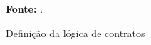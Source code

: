 \begin{figure}[ht!]
\centering

\caption{\textmd{Definição da lógica de contratos}}
\label{fig:ergologica}

\par\medskip\textbf{Fonte:} \cite{accordproject}. \par\medskip

\end{figure}

